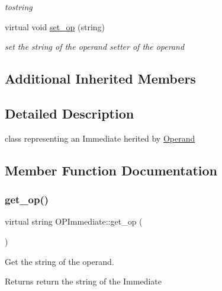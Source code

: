 \begin{DoxyCompactItemize}
\begin{DoxyCompactList}\small\item\em tostring \end{DoxyCompactList}\item 
\mbox{\label{class_o_p_immediate_ae5d6c30c6bff17de4e7fabb24cf6bf59}} 
virtual void \mbox{\hyperlink{class_o_p_immediate_ae5d6c30c6bff17de4e7fabb24cf6bf59}{set\+\_\+op}} (string)
\begin{DoxyCompactList}\small\item\em set the string of the operand setter of the operand \end{DoxyCompactList}\end{DoxyCompactItemize}
\subsection*{Additional Inherited Members}


\subsection{Detailed Description}
class representing an Immediate herited by \mbox{\hyperlink{class_operand}{Operand}} 

\subsection{Member Function Documentation}
\mbox{\label{class_o_p_immediate_ad714fb614c0d8f4afa1157a34b2936fd}} 
\subsubsection{\texorpdfstring{get\+\_\+op()}{get\_op()}}
{\footnotesize\ttfamily virtual string O\+P\+Immediate\+::get\+\_\+op (\begin{DoxyParamCaption}{ }\end{DoxyParamCaption})\hspace{0.3cm}{\ttfamily [virtual]}}



Get the string of the operand. 

\begin{DoxyReturn}{Returns}
return the string of the Immediate 
\end{DoxyReturn}


